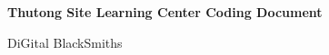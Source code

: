 \documentclass[12pt,a4paper]{article}
\begin{document}
	
	\begin{titlepage}
		\centering
		\vspace*{\fill}
		
		\vspace*{0.5cm}
		
		\huge\bfseries
			Thutong Site Learning Center Coding Document
	
		\vspace*{0.5cm}
	
		\large DiGital BlackSmiths
		
		\vspace*{\fill}
	\end{titlepage}
	
\end{document}
